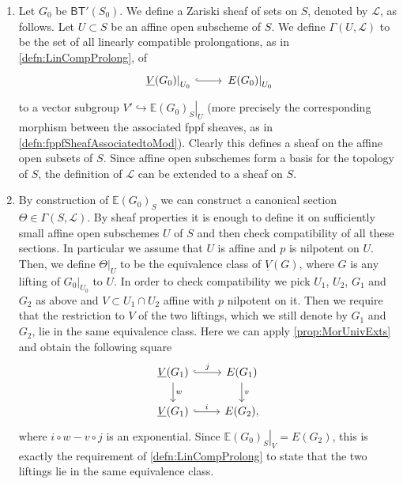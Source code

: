 \begin{rem}[]\leavevmode\vspace{-.2\baselineskip}
\begin{enumerate}
	\item Let $G_0$ be $\mathsf{BT}'(S_0)$.
		We define a Zariski sheaf of sets on $S$, denoted by $\mathscr{L}$,
		as follows.
		Let $U \subset S$ be an affine open subscheme of $S$.
		We define $\Gamma(U,\mathscr{L})$ to be the set of all linearly compatible prolongations,
		as in \cref{defn:LinCompProlong}, of
		\begin{equation*}
		\begin{tikzcd}[row sep = 0ex
			,/tikz/column 1/.append style={anchor=base east}
			,/tikz/column 2/.append style={anchor=base west}]
			\left.\underline{V}(G_0)\right|_{U_0} \arrow[r, "", hookrightarrow] &
			\left.E(G_0)\right|_{U_0}
		\end{tikzcd}
		\end{equation*} 
		to a vector subgroup $V' \hookrightarrow \left.\mathbb{E}(G_0)_S\right|_{U}$
		(more precisely the corresponding morphism between the associated
		fppf sheaves, as in \cref{defn:fppfSheafAssociatedtoMod}).
		Clearly this defines a sheaf on the affine open subsets of $S$.
		Since affine open subschemes form a basis for the topology of $S$, the definition
		of $\mathscr{L}$ can be extended to a sheaf on $S$.

	\item By construction of $\mathbb{E}(G_0)_S$ we can construct a canonical
		section $\Theta \in \Gamma(S, \mathscr{L})$.
		By sheaf properties it is enough to define it on sufficiently small
		affine open subschemes $U$ of $S$ and then check compatibility of all
		these sections.
		In particular we assume that $U$ is affine and $p$ is nilpotent on $U$.
		Then, we define $\left.\Theta\right|_{ U }$ to be the equivalence class
		of $\underline{V}(G)$, where $G$ is any lifting of $\left.G_0\right|_{ U_0 }$
		to $U$.
		In order to check compatibility we pick $U_1$, $U_2$, $G_1$ and $G_2$
		as above and $V \subset U_1 \cap U_2$ affine
		with $p$ nilpotent on it.
		Then we require that the restriction to $V$ of the two liftings,
		which we still denote by $G_1$ and $G_2$, lie in the same equivalence class.
		Here we can apply \cref{prop:MorUnivExts} and obtain the following
		square
		\begin{equation*}
		\begin{tikzcd}
			\underline{V}(G_1) \arrow[r, "j", hookrightarrow] 
			\arrow[d, "w", rightarrow] &
			E(G_1) \arrow[d, "v", rightarrow] \\
			\underline{V}(G_1) \arrow[r, "i", hookrightarrow] &
			E(G_2)
		,\end{tikzcd}
		\end{equation*}
		where $i \circ w - v \circ j$ is an exponential.
		Since $\left.\mathbb{E}(G_0)_S\right|_{ V } = E(G_2)$,
		this is exactly the requirement of \cref{defn:LinCompProlong} 
		to state that the two liftings lie in the same equivalence class.


\end{enumerate}
\end{rem}
